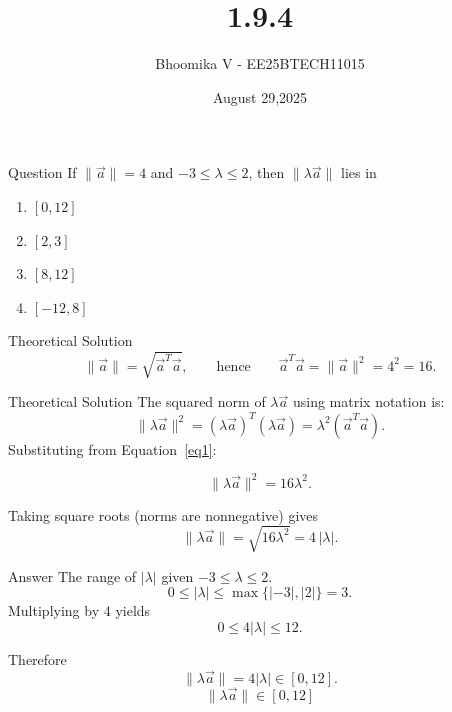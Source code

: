 \documentclass{beamer}
\begin{document}
\title 
{1.9.4}
\date{August 29,2025}


\author 
{Bhoomika V - EE25BTECH11015}




\frame{\titlepage}
\begin{frame}{Question}
If $\lVert \vec{a} \rVert = 4$ and $-3 \le \lambda \le 2$, then $\lVert \lambda \vec{a} \rVert$ lies in
\begin{enumerate}
  \item $[0,12]$
  \item $[2,3]$
  \item $[8,12]$
  \item $[-12,8]$
\end{enumerate} 
\end{frame}



\begin{frame}{Theoretical Solution}
\begin{equation}
  \|\vec{a}\| = \sqrt{\vec{a}^T \vec{a}}, 
  \qquad \text{hence} \qquad 
  \vec{a}^T \vec{a} = \|\vec{a}\|^2 = 4^2 = 16.
  \label{eq1}
\end{equation}
\end{frame}




\begin{frame}{Theoretical Solution}
  The squared norm of \(\lambda \vec{a}\) using matrix notation is:
  \[
    \|\lambda \vec{a}\|^2 = (\lambda \vec{a})^T(\lambda \vec{a}) 
    = \lambda^2 (\vec{a}^T \vec{a}).
  \]
  Substituting from Equation~\eqref{eq1}:

  \[
    \|\lambda \vec{a}\|^2 = 16 \lambda^2.
  \]

  Taking square roots (norms are nonnegative) gives
  \[
    \|\lambda \vec{a}\| = \sqrt{16\lambda^2} = 4\,|\lambda|.
  \]  


\end{frame}

\begin{frame}{Answer}
 The range of \(|\lambda|\) given \(-3 \le \lambda \le 2\).
  \[
    0 \le |\lambda| \le \max\{|-3|,|2|\} = 3.
  \]
  Multiplying by \(4\) yields
  \[
    0 \le 4|\lambda| \le 12.
  \]

  Therefore
  \[
    \|\lambda \vec{a}\| = 4|\lambda| \in [0,12].
  \]
  \[
    \boxed{\; \|\lambda \vec{a}\| \in [0,12]\; }
  \]

\end{frame}
\end{document}
